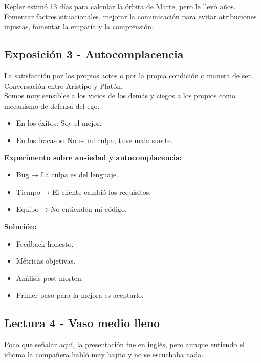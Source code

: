 \documentclass[12pt, a4paper, twoside]{article}
\begin{document}
Kepler estimó 13 días para calcular la órbita de Marte, pero le llevó años.\\

Fomentar factres situacionales, mejorar la comunicación para evitar atribuciones injustas,
fomentar la empatía y la comprensión.\\

\subsection{Exposición 3 - Autocomplacencia}

La satisfacción por los propios actos o por la propia condición o manera de ser.\\
Conversación entre Aristipo y Platón.\\
Somos muy sensibles a los vicios de los demás y ciegos a los propios como mecanismo
de defensa del ego. \\
\begin{itemize}
    \item{En los éxitos: Soy el mejor.}
    \item{En los fracasos: No es mi culpa, tuve mala suerte.}
\end{itemize}
\textbf{Experimento sobre ansiedad y autocomplacencia:} 

\begin{itemize}
    \item{Bug → La culpa es del lenguaje.}
    \item{Tiempo → El cliente cambió los requisitos.}
    \item{Equipo → No entienden mi código.}
\end{itemize}

\noindent\textbf{Solución:}

\begin{itemize}
    \item{Feedback honesto.}
    \item{Métricas objetivas.}
    \item{Análisis post morten.}
    \item{Primer paso para la mejora es aceptarlo.}
\end{itemize}

\subsection{Lectura 4 - Vaso medio lleno}
Poco que señalar aquí, la presentación fue en inglés, pero aunque entiendo el idioma la 
compañera habló muy bajito y no se escuchaba nada.\\
\end{document}

